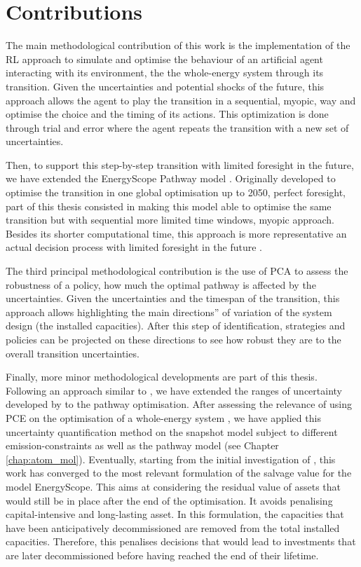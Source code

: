 \section*{Contributions}
\label{sec:meth:contributions}
The main methodological contribution of this work is the implementation of the \gls{RL} approach to simulate and optimise the behaviour of an artificial agent interacting with its environment, \ie the the whole-energy system through its transition. Given the uncertainties and potential shocks of the future, this approach allows the agent to play the transition in a sequential, \ie myopic, way and optimise the choice and the timing of its actions. This optimization is done through trial and error where the agent repeats the transition with a new set of uncertainties. 

Then, to support this step-by-step transition with limited foresight in the future, we have extended the EnergyScope Pathway model \cite{limpens2021generating}. Originally developed to optimise the transition in one global optimisation up to 2050, \ie perfect foresight, part of this thesis consisted in making this model able to optimise the same transition but with sequential more limited time windows, \ie myopic approach. Besides its shorter computational time, this approach is more representative an actual decision process with limited foresight in the future \cite{babrowski2014reducing}.

The third principal methodological contribution is the use of \acrfull{PCA} to assess the robustness of a policy, \ie how much the optimal pathway is affected by the uncertainties. Given the uncertainties and the timespan of the transition, this approach allows highlighting the main \og directions'' of variation of the system design (\ie the installed capacities). After this step of identification, strategies and policies can be projected on these directions to see how robust they are to the overall transition uncertainties.

Finally, more minor methodological developments are part of this thesis. Following an approach similar to \citet{guevara2022modeling}, we have extended the ranges of uncertainty developed by \citet{Moret2017} to the pathway optimisation. After assessing the relevance of using \acrfull{PCE} on the optimisation of a whole-energy system \cite{limpens2020impact}, we have applied this uncertainty quantification method on the snapshot model subject to different emission-constraints \cite{rixhon2021role} as well as the pathway model (see Chapter \ref{chap:atom_mol}). Eventually, starting from the initial investigation of \citet{goffauxpathway}, this work has converged to the most relevant formulation of the salvage value for the model EnergyScope. This aims at considering the residual value of assets that would still be in place after the end of the optimisation. It avoids penalising capital-intensive and long-lasting asset. In this formulation, the capacities that have been anticipatively decommissioned are removed from the total installed capacities. Therefore, this penalises decisions that would lead to investments that are later decommissioned before having reached the end of their lifetime.

